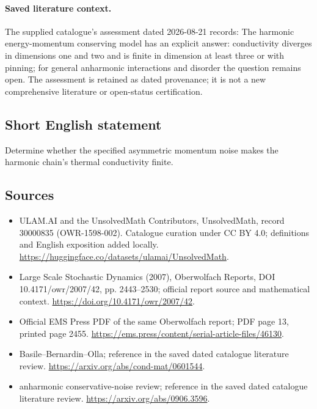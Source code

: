 \documentclass[11pt]{article}
\begin{document}
\paragraph{Saved literature context.} The supplied catalogue's assessment dated 2026-08-21 records: The harmonic energy-momentum conserving model has an explicit answer: conductivity diverges in dimensions one and two and is finite in dimension at least three or with pinning; for general anharmonic interactions and disorder the question remains open. The assessment is retained as dated provenance; it is not a new comprehensive literature or open-status certification.
\subsection{Short English statement}
Determine whether the specified asymmetric momentum noise makes the harmonic chain's thermal conductivity finite.
\subsection{Sources}
\begin{itemize}
\item[\hypertarget{source:30000835:1}{S1}] ULAM.AI and the UnsolvedMath Contributors, UnsolvedMath, record 30000835 (OWR-1598-002). Catalogue curation under CC BY 4.0; definitions and English exposition added locally.
\url{https://huggingface.co/datasets/ulamai/UnsolvedMath}.
\item[\hypertarget{source:30000835:2}{S2}] Large Scale Stochastic Dynamics (2007), Oberwolfach Reports, DOI 10.4171/owr/2007/42, pp. 2443--2530; official report source and mathematical context.
\url{https://doi.org/10.4171/owr/2007/42}.
\item[\hypertarget{source:30000835:3}{S3}] Official EMS Press PDF of the same Oberwolfach report; PDF page 13, printed page 2455.
\url{https://ems.press/content/serial-article-files/46130}.
\item[\hypertarget{source:30000835:4}{S4}] Basile--Bernardin--Olla; reference in the saved dated catalogue literature review.
\url{https://arxiv.org/abs/cond-mat/0601544}.
\item[\hypertarget{source:30000835:5}{S5}] anharmonic conservative-noise review; reference in the saved dated catalogue literature review.
\url{https://arxiv.org/abs/0906.3596}.
\end{itemize}
\label{end:30000835}
\end{document}
